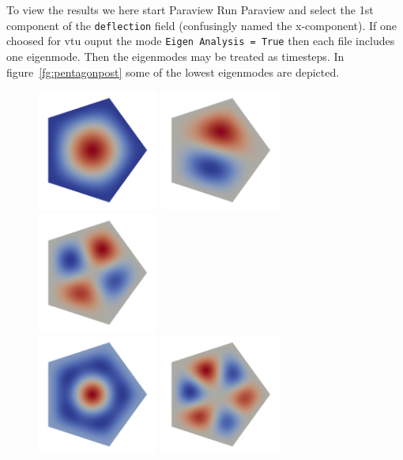 To view the results we here start Paraview
\ttbegin
Run
  Paraview
\ttend
and select the 1st component of the \texttt{deflection} field
(confusingly named the x-component). 
If one choosed for vtu ouput the mode \texttt{Eigen Analysis = True} then each file includes
one eigenmode. Then the eigenmodes may be treated as timesteps. 
In figure~\ref{fg:pentagonpost} some of the lowest eigenmodes are depicted.
\begin{figure}
  \begin{center}
\includegraphics[width=40mm]{mode1}
\includegraphics[width=40mm]{mode2}
\includegraphics[width=40mm]{mode4} \\
\includegraphics[width=40mm]{mode6}
\includegraphics[width=40mm]{mode7}

\end{center}
\end{figure}
